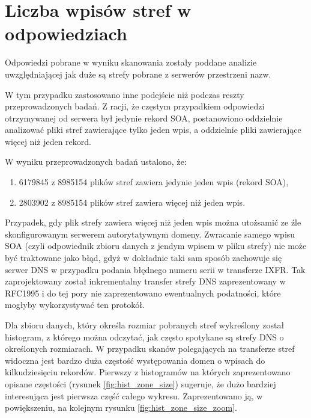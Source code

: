 \section{Liczba wpisów stref w odpowiedziach}
Odpowiedzi pobrane w wyniku skanowania zostały poddane analizie uwzględniającej jak duże są strefy pobrane z serwerów przestrzeni nazw. 

W tym przypadku zastosowano inne podejście niż podczas reszty przeprowadzonych badań. Z racji, że częstym przypadkiem odpowiedzi otrzymywanej od serwera był jedynie rekord SOA, postanowiono oddzielnie analizować pliki stref zawierające tylko jeden wpis, a oddzielnie pliki zawierające więcej niż jeden rekord.

W wyniku przeprowadzonych badań ustalono, że:
\begin{enumerate}
	\item 6179845 z 8985154 plików stref zawiera jedynie jeden wpis (rekord SOA),
	\item 2803902 z 8985154 plików stref zawiera więcej niż jeden wpis.
\end{enumerate}
Przypadek, gdy plik strefy zawiera więcej niż jeden wpis można utożsamić ze źle skonfigurowanym serwerem autorytatywnym domeny. Zwracanie samego wpisu SOA (czyli odpowiednik zbioru danych z jendym wpisem w pliku strefy) nie może być traktowane jako błąd, gdyż w dokładnie taki sam sposób zachowuje się serwer DNS w przypadku podania błędnego numeru serii w transferze IXFR. Tak zaprojektowany został inkrementalny transfer strefy DNS zaprezentowany w RFC1995\cite{RFC1995} i do tej pory nie zaprezentowano ewentualnych podatności, które mogłyby wykorzystywać ten protokół.

Dla zbioru danych, który określa rozmiar pobranych stref wykreślony został histogram, z którego można odczytać, jak często spotykane są strefy DNS o określonych rozmiarach. W przypadku skanów polegających na transferze stref widoczna jest bardzo duża częstość występowania domen o wpisach do kilkudziesięciu rekordów. Pierwszy z histogramów na których zaprezentowano opisane częstości (rysunek \ref{fig:hist_zone_size}) sugeruje, że dużo bardziej interesująca jest pierwsza część całego wykresu. Zaprezentowano ją, w powiększeniu, na kolejnym rysunku \ref{fig:hist_zone_size_zoom}.

